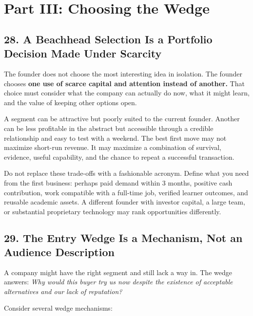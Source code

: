 \section*{Part III: Choosing the Wedge}

\subsection*{28. A Beachhead Selection Is a Portfolio Decision Made Under Scarcity}

The founder does not choose the most interesting idea in isolation. The founder chooses \textbf{one use of scarce capital and attention instead of another.} That choice must consider what the company can actually do now, what it might learn, and the value of keeping other options open.

A segment can be attractive but poorly suited to the current founder. Another can be less profitable in the abstract but accessible through a credible relationship and easy to test with a weekend. The best first move may not maximize short-run revenue. It may maximize a combination of survival, evidence, useful capability, and the chance to repeat a successful transaction.

Do not replace these trade-offs with a fashionable acronym. Define what you need from the first business: perhaps paid demand within 3 months, positive cash contribution, work compatible with a full-time job, verified learner outcomes, and reusable academic assets. A different founder with investor capital, a large team, or substantial proprietary technology may rank opportunities differently.

\subsection*{29. The Entry Wedge Is a Mechanism, Not an Audience Description}

A company might have the right segment and still lack a way in. The wedge answers: \emph{Why would this buyer try us now despite the existence of acceptable alternatives and our lack of reputation?}

Consider several wedge mechanisms:

